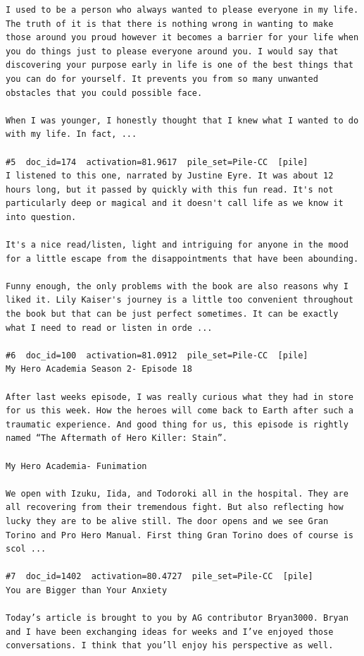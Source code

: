 \begin{verbatim}
I used to be a person who always wanted to please everyone in my life. The truth of it is that there is nothing wrong in wanting to make those around you proud however it becomes a barrier for your life when you do things just to please everyone around you. I would say that discovering your purpose early in life is one of the best things that you can do for yourself. It prevents you from so many unwanted obstacles that you could possible face.

When I was younger, I honestly thought that I knew what I wanted to do with my life. In fact, ...

#5  doc_id=174  activation=81.9617  pile_set=Pile-CC  [pile]
I listened to this one, narrated by Justine Eyre. It was about 12 hours long, but it passed by quickly with this fun read. It's not particularly deep or magical and it doesn't call life as we know it into question.

It's a nice read/listen, light and intriguing for anyone in the mood for a little escape from the disappointments that have been abounding.

Funny enough, the only problems with the book are also reasons why I liked it. Lily Kaiser's journey is a little too convenient throughout the book but that can be just perfect sometimes. It can be exactly what I need to read or listen in orde ...

#6  doc_id=100  activation=81.0912  pile_set=Pile-CC  [pile]
My Hero Academia Season 2- Episode 18

After last weeks episode, I was really curious what they had in store for us this week. How the heroes will come back to Earth after such a traumatic experience. And good thing for us, this episode is rightly named “The Aftermath of Hero Killer: Stain”.

My Hero Academia- Funimation

We open with Izuku, Iida, and Todoroki all in the hospital. They are all recovering from their tremendous fight. But also reflecting how lucky they are to be alive still. The door opens and we see Gran Torino and Pro Hero Manual. First thing Gran Torino does of course is scol ...

#7  doc_id=1402  activation=80.4727  pile_set=Pile-CC  [pile]
You are Bigger than Your Anxiety

Today’s article is brought to you by AG contributor Bryan3000. Bryan and I have been exchanging ideas for weeks and I’ve enjoyed those conversations. I think that you’ll enjoy his perspective as well.


\end{verbatim}
